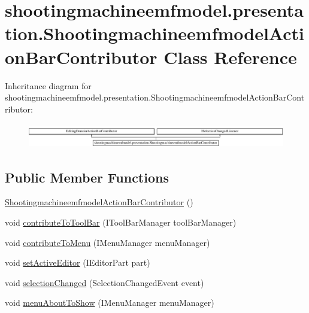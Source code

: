 \hypertarget{classshootingmachineemfmodel_1_1presentation_1_1_shootingmachineemfmodel_action_bar_contributor}{\section{shootingmachineemfmodel.\-presentation.\-Shootingmachineemfmodel\-Action\-Bar\-Contributor Class Reference}
\label{classshootingmachineemfmodel_1_1presentation_1_1_shootingmachineemfmodel_action_bar_contributor}
}
Inheritance diagram for shootingmachineemfmodel.\-presentation.\-Shootingmachineemfmodel\-Action\-Bar\-Contributor\-:\begin{figure}[H]
\begin{center}
\leavevmode
\includegraphics[height=1.093750cm]{classshootingmachineemfmodel_1_1presentation_1_1_shootingmachineemfmodel_action_bar_contributor}
\end{center}
\end{figure}
\subsection*{Public Member Functions}
\begin{DoxyCompactItemize}
\item 
\hyperlink{classshootingmachineemfmodel_1_1presentation_1_1_shootingmachineemfmodel_action_bar_contributor_ad6b52a177077db5adbfb1446572f13a1}{Shootingmachineemfmodel\-Action\-Bar\-Contributor} ()
\item 
void \hyperlink{classshootingmachineemfmodel_1_1presentation_1_1_shootingmachineemfmodel_action_bar_contributor_ae5e5297bee6925028d485191fac77ad7}{contribute\-To\-Tool\-Bar} (I\-Tool\-Bar\-Manager tool\-Bar\-Manager)
\item 
void \hyperlink{classshootingmachineemfmodel_1_1presentation_1_1_shootingmachineemfmodel_action_bar_contributor_a4cf1b52dab695f7703a34b1c8dcb727d}{contribute\-To\-Menu} (I\-Menu\-Manager menu\-Manager)
\item 
void \hyperlink{classshootingmachineemfmodel_1_1presentation_1_1_shootingmachineemfmodel_action_bar_contributor_a91330c91fed39f8e34835f322100141e}{set\-Active\-Editor} (I\-Editor\-Part part)
\item 
void \hyperlink{classshootingmachineemfmodel_1_1presentation_1_1_shootingmachineemfmodel_action_bar_contributor_a7d90443b54ee53df7541090b0251f223}{selection\-Changed} (Selection\-Changed\-Event event)
\item 
void \hyperlink{classshootingmachineemfmodel_1_1presentation_1_1_shootingmachineemfmodel_action_bar_contributor_a3d027b08f3699f1f52cff68b30f39e44}{menu\-About\-To\-Show} (I\-Menu\-Manager menu\-Manager)
\end{DoxyCompactItemize}
